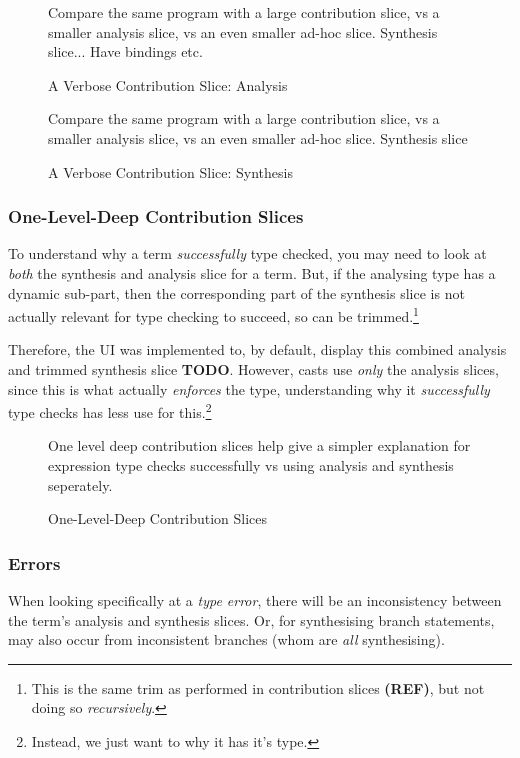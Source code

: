\begin{figure}[h]
\centering
Compare the same program with a large contribution slice, vs a smaller analysis slice, vs an even smaller ad-hoc slice. Synthesis slice... Have bindings etc.
\caption{A Verbose Contribution Slice: Analysis}\label{fig:VerboseSlice1}
\end{figure}
\begin{figure}
\centering
Compare the same program with a large contribution slice, vs a smaller analysis slice, vs an even smaller ad-hoc slice. Synthesis slice
\caption{A Verbose Contribution Slice: Synthesis}
\label{fig:VerboseSlice2}
\end{figure}

\subsubsection{One-Level-Deep Contribution Slices}
To understand why a term \textit{successfully} type checked, you may need to look at \textit{both} the synthesis and analysis slice for a term. But, if the analysing type has a dynamic sub-part, then the corresponding part of the synthesis slice is not actually relevant for type checking to succeed, so can be trimmed.\footnote{This is the same trim as performed  in contribution slices \textbf{(REF)}, but not doing so \textit{recursively}.} 

Therefore, the UI was implemented to, by default, display this combined analysis and trimmed synthesis slice \textbf{TODO}. However, casts use \textit{only} the analysis slices, since this is what actually \textit{enforces} the type, understanding why it \textit{successfully} type checks has less use for this.\footnote{Instead, we just want to why it has it's type.}

\begin{figure}
One level deep contribution slices help give a simpler explanation for expression type checks successfully vs using analysis and synthesis seperately.
\caption{One-Level-Deep Contribution Slices}
\end{figure}

\subsubsection{Errors}
When looking specifically at a \textit{type error}, there will be an inconsistency between the term's analysis and synthesis slices. Or, for synthesising branch statements, may also occur from inconsistent branches (whom are \textit{all} synthesising).

